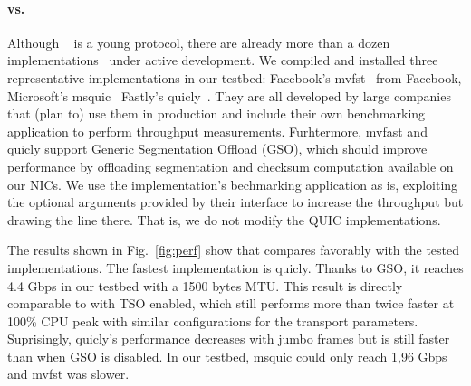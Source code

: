 \paragraph{\tcpls vs. \quic}
Although \quic~\cite{draft-ietf-quic-transport} is a young protocol, there are
already more than a dozen
implementations~\cite{marx2020same,quicimplem,yang2020making} under active
development. We compiled and installed three representative \quic
implementations in our testbed: Facebook's mvfst~\cite{mvfst-github,
  Joras_mvfst} from Facebook, Microsoft's msquic~\cite{msquic-github} Fastly's
quicly~\cite{quicly-github}. They are all developed by large companies that (plan to) use
them in production and include their own benchmarking application to perform
throughput measurements. Furhtermore, mvfast and quicly support Generic
Segmentation Offload (GSO), which should improve performance by offloading \udp
segmentation and checksum computation available on our NICs. We use the
implementation's bechmarking application as is, exploiting the optional
arguments provided by their interface to increase the throughput but drawing the
line there. That is, we do not modify the QUIC implementations.

The results shown in Fig.~\ref{fig:perf} show that \tcpls compares favorably
with the tested \quic implementations. The fastest \quic implementation is
quicly. Thanks to GSO, it reaches 4.4 Gbps in our testbed with a 1500 bytes
MTU. This result is directly comparable to \tcpls with TSO enabled, which still
performs more than twice faster at 100\% CPU peak with similar configurations
for the transport parameters. Suprisingly, quicly's performance decreases with
jumbo frames but is still faster than when GSO is disabled. In our testbed,
msquic could only reach 1,96 Gbps and mvfst was slower.







